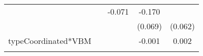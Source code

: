 \documentclass[12pt,twoside]{reedthesis}
\begin{document}
\begin{longtable}[]{@{}lcccc@{}}
\begin{minipage}[t]{0.12\columnwidth}
  \strut
  \end{minipage} & \begin{minipage}[t]{0.14\columnwidth}\centering\strut
  \strut
  \end{minipage} & \begin{minipage}[t]{0.14\columnwidth}\centering\strut
  -0.071\strut
  \end{minipage} & \begin{minipage}[t]{0.11\columnwidth}\centering\strut
  -0.170\strut
  \end{minipage}\tabularnewline
  \begin{minipage}[t]{0.26\columnwidth}\raggedright\strut
  \strut
  \end{minipage} & \begin{minipage}[t]{0.12\columnwidth}\centering\strut
  \strut
  \end{minipage} & \begin{minipage}[t]{0.14\columnwidth}\centering\strut
  \strut
  \end{minipage} & \begin{minipage}[t]{0.14\columnwidth}\centering\strut
  (0.069)\strut
  \end{minipage} & \begin{minipage}[t]{0.11\columnwidth}\centering\strut
  (0.062)\strut
  \end{minipage}\tabularnewline
  \begin{minipage}[t]{0.26\columnwidth}\raggedright\strut
  typeCoordinated*VBM\strut
  \end{minipage} & \begin{minipage}[t]{0.12\columnwidth}\centering\strut
  \strut
  \end{minipage} & \begin{minipage}[t]{0.14\columnwidth}\centering\strut
  \strut
  \end{minipage} & \begin{minipage}[t]{0.14\columnwidth}\centering\strut
  -0.001\strut
  \end{minipage} & \begin{minipage}[t]{0.11\columnwidth}\centering\strut
  0.002\strut
  \end{minipage}\tabularnewline
  \begin{minipage}[t]{0.26\columnwidth}\raggedright\strut
  \strut
  \end{minipage} & \begin{minipage}[t]{0.12\columnwidth}\centering\strut
  \strut
  \end{minipage} & \begin{minipage}[t]{0.14\columnwidth}\centering\strut

\end{minipage}
\end{longtable}
\end{document}
